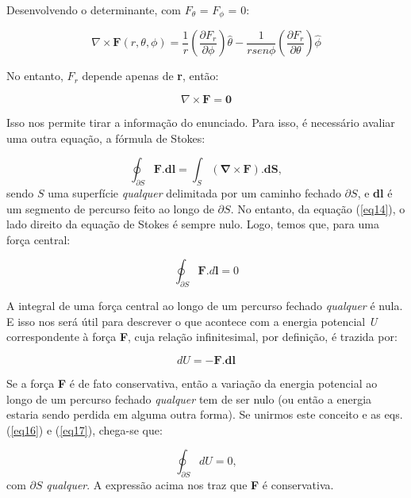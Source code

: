 Desenvolvendo o determinante, com $F_{\theta}$ = $F_{\phi}$ = 0:

\[
	\nabla \times \textbf{F} (r,\theta,\phi) = \frac{1}{r}\left(\frac{\partial F_r}{\partial \phi}\right)\hat{\theta} - \frac{1}{rsen\phi}\left(\frac{\partial F_r}{\partial \theta}\right)\hat{\phi}
\]

No entanto, $F_r$ depende apenas de \textbf{r}, então:

\begin{equation}
	\nabla \times \mathbf{F} = \mathbf{0} \label{eq14}
\end{equation}

Isso nos permite tirar a informação do enunciado. Para isso, é necessário avaliar uma outra equação, a fórmula de Stokes:

\begin{equation}
	\oint_{\partial S} \mathbf{F}.\mathbf{dl} = \int_S (\mathbf{\nabla \times F}).\mathbf{dS}, \label{eq15}
\end{equation}
sendo $S$ uma superfície \textit{qualquer} delimitada por um caminho fechado $\partial S$, e \textbf{dl} é um segmento de percurso feito ao longo de $\partial S$. No entanto, da equação (\ref{eq14}), o lado direito da equação de Stokes é sempre nulo. Logo, temos que, para uma força central:

\begin{equation}
	\oint_{\partial S} \mathbf{F}.d\mathbf{l} = 0 \label{eq16}
\end{equation}

A integral de uma força central ao longo de um percurso fechado \textit{qualquer} é nula. E isso nos será útil para descrever o que acontece com a energia potencial \textit{U} correspondente à força \textbf{F}, cuja relação infinitesimal, por definição, é trazida por:

\begin{equation}
	dU= - \mathbf{F}.\mathbf{dl}  \label{eq17}
\end{equation}

Se a força \textbf{F} é de fato conservativa, então a variação da energia potencial ao longo de um percurso fechado \textit{qualquer} tem de ser nulo (ou então a energia estaria sendo perdida em alguma outra forma). Se unirmos este conceito e as eqs. (\ref{eq16}) e (\ref{eq17}), chega-se que:

\begin{equation}
	\oint_{\partial S} dU = 0, \label{eq18}
\end{equation}
com $\partial S$ \textit{qualquer}. A expressão acima nos traz que \textbf{F} é conservativa.

